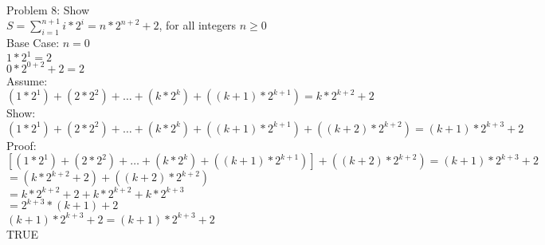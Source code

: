 \documentclass[12pt]{article}
\begin{document}
        \\Problem 8: Show
        \\ \indent \indent$ S= \sum\limits_{i=1}^{n+1} i*2^i = n* 2^{n+2} + 2$, for all integers $n \geq 0 $
        \\\indent Base Case: $n=0$
        \\\indent \indent $1*2^1 = 2$
        \\\indent \indent $0*2^{0+2}+2 =2 $
        \\\indent Assume:
        \\\indent \indent $(1*2^1)+(2*2^2)+ \ldots +(k*2^k)+((k+1)*2^{k+1}) = k*2^{k+2}+2$
        \\\indent Show:
        \\\indent \indent $(1*2^1)+(2*2^2)+ \ldots +(k*2^k)+((k+1)*2^{k+1})+((k+2)*2^{k+2}) = (k+1)*2^{k+3}+2$
        \\\indent Proof:
        \\\indent \indent $[(1*2^1)+(2*2^2)+ \ldots +(k*2^k)+((k+1)*2^{k+1})]+((k+2)*2^{k+2}) = (k+1)*2^{k+3}+2$        
        \\\indent \indent $=(k*2^{k+2}+2)+((k+2)*2^{k+2})$
        \\\indent \indent $=k*2^{k+2}+2+k*2^{k+2}+k*2^{k+3}$
        \\\indent \indent $=2^{k+3}*(k+1)+2$
        \\\indent \indent $(k+1)*2^{k+3}+2=(k+1)*2^{k+3}+2$
         \\\indent \indent TRUE 
\end{document}
